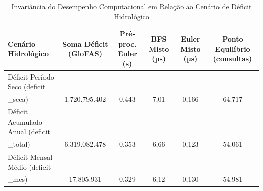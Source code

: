 \begin{table}[htbp]
\centering
\footnotesize
\caption{Invariância do Desempenho Computacional em Relação ao Cenário de Déficit Hidrológico}
\label{tab:cenarios_deficit}
\begin{tabular}{lccccc}
\toprule
Cenário Hidrológico & Soma Déficit (GloFAS) & Pré-proc. Euler (s) & BFS Misto (µs) & Euler Misto (µs) & Ponto Equilíbrio (consultas) \\
\midrule
Déficit Período Seco (deficit\\_seca) & 1.720.795.402 & 0,443 & 7,01 & 0,166 & 64.717 \\
Déficit Acumulado Anual (deficit\\_total) & 6.319.082.478 & 0,353 & 6,66 & 0,123 & 54.061 \\
Déficit Mensal Médio (deficit\\_mes) & 17.805.931 & 0,329 & 6,12 & 0,130 & 54.981 \\
\bottomrule
\end{tabular}
\end{table}